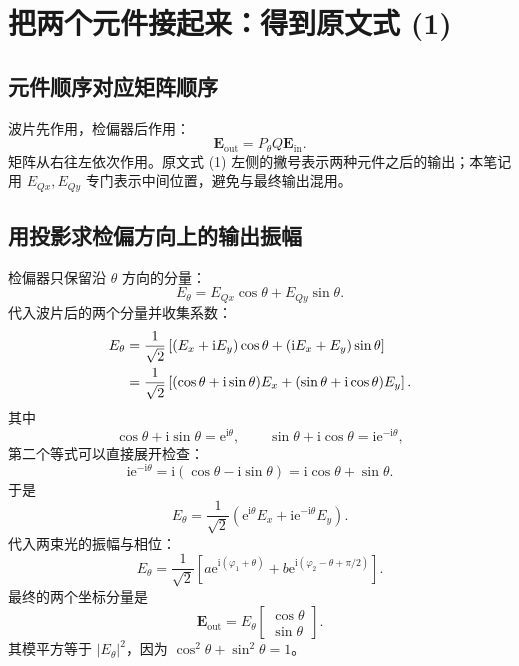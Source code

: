 \documentclass[UTF8,fontset=fandol,11pt,a4paper]{ctexart}
\newcommand{\ii}{\mathrm i}
\newcommand{\ee}{\mathrm e}
\newcommand{\colvec}[2]{\begin{bmatrix}#1\\#2\end{bmatrix}}
\begin{document}
\clearpage
\section{把两个元件接起来：得到原文式 (1)}
\subsection{元件顺序对应矩阵顺序}
波片先作用，检偏器后作用：
\begin{equation}
\boxed{\mathbf E_{\mathrm{out}}=P_\theta Q\mathbf E_{\mathrm{in}}.}
\end{equation}
矩阵从右往左依次作用。原文式 (1) 左侧的撇号表示两种元件之后的输出；本笔记用 $E_{Qx},E_{Qy}$ 专门表示中间位置，避免与最终输出混用。

\subsection{用投影求检偏方向上的输出振幅}
检偏器只保留沿 $\theta$ 方向的分量：
\begin{equation}
E_\theta=E_{Qx}\cos\theta+E_{Qy}\sin\theta.
\end{equation}
代入波片后的两个分量并收集系数：
\begin{align}
E_\theta
&=\frac1{\sqrt2}\left[(E_x+\ii E_y)\cos\theta
+(\ii E_x+E_y)\sin\theta\right]\notag\\
&=\frac1{\sqrt2}\left[(\cos\theta+\ii\sin\theta)E_x
+(\sin\theta+\ii\cos\theta)E_y\right].
\end{align}
其中
\begin{equation}
\cos\theta+\ii\sin\theta=\ee^{\ii\theta},\qquad
\sin\theta+\ii\cos\theta=\ii\ee^{-\ii\theta},
\end{equation}
第二个等式可以直接展开检查：
\begin{equation}
\ii\ee^{-\ii\theta}=\ii(\cos\theta-\ii\sin\theta)
=\ii\cos\theta+\sin\theta.
\end{equation}
于是
\begin{equation}
\boxed{E_\theta=\frac1{\sqrt2}(\ee^{\ii\theta}E_x+\ii\ee^{-\ii\theta}E_y).}
\end{equation}
代入两束光的振幅与相位：
\begin{equation}
\boxed{E_\theta=\frac1{\sqrt2}\left[
a\ee^{\ii(\varphi_1+\theta)}
+b\ee^{\ii(\varphi_2-\theta+\pi/2)}\right].}
\end{equation}
最终的两个坐标分量是
\begin{equation}
\mathbf E_{\mathrm{out}}=E_\theta\colvec{\cos\theta}{\sin\theta}.
\end{equation}
其模平方等于 $|E_\theta|^2$，因为 $\cos^2\theta+\sin^2\theta=1$。
\end{document}
